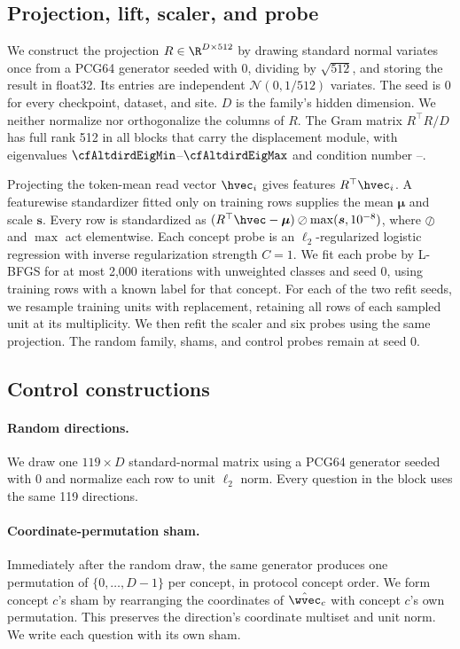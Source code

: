 \subsection{Projection, lift, scaler, and probe}
\label{app:repro-probe}

We construct the projection $R\in\R^{D\times512}$ by drawing standard normal variates once from a PCG64 generator seeded with $0$, dividing by $\sqrt{512}$, and storing the result in float32. Its entries are independent $\mathcal{N}(0,1/512)$ variates. The seed is $0$ for every checkpoint, dataset, and site. $D$ is the family's hidden dimension. We neither normalize nor orthogonalize the columns of $R$. The Gram matrix $R^{\top}R/D$ has full rank 512 in all \cfAltdirdBlocks{} blocks that carry the displacement module, with eigenvalues $\cfAltdirdEigMin$--$\cfAltdirdEigMax$ and condition number \cfAltdirdCondMin{}--\cfAltdirdCondMax{}.

Projecting the token-mean read vector $\hvec_i$ gives features $R^{\top}\hvec_i$. A featurewise standardizer fitted only on training rows supplies the mean $\boldsymbol\mu$ and scale $\boldsymbol s$. Every row is standardized as $(R^{\top}\hvec-\boldsymbol\mu)\oslash\max(\boldsymbol s,10^{-8})$, where $\oslash$ and $\max$ act elementwise. Each concept probe is an $\ell_2$-regularized logistic regression with inverse regularization strength $C=1$. We fit each probe by L-BFGS for at most 2{,}000 iterations with unweighted classes and seed $0$, using training rows with a known label for that concept. For each of the two refit seeds, we resample training units with replacement, retaining all rows of each sampled unit at its multiplicity. We then refit the scaler and six probes using the same projection. The random family, shams, and control probes remain at seed 0.

\subsection{Control constructions}
\label{app:repro-controls}

\paragraph{Random directions.} We draw one $119\times D$ standard-normal matrix using a PCG64 generator seeded with $0$ and normalize each row to unit $\ell_2$ norm. Every question in the block uses the same 119 directions.

\paragraph{Coordinate-permutation sham.} Immediately after the random draw, the same generator produces one permutation of $\{0,\dots,D{-}1\}$ per concept, in protocol concept order. We form concept $c$'s sham by rearranging the coordinates of $\hat\wvec_c$ with concept $c$'s own permutation. This preserves the direction's coordinate multiset and unit norm. We write each question with its own sham.

